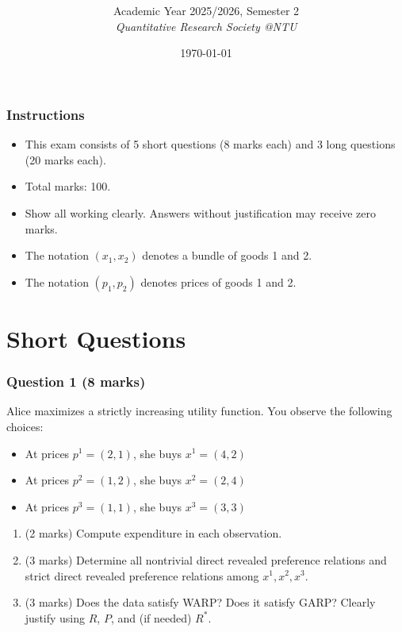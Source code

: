 \documentclass[12pt]{article}
\title{
\CourseCode \CourseName \\[0.3em]
\large \DocType
}
\author{
  Academic Year 2025/2026, Semester 2 \\[0.25em]
  \textit{Quantitative Research Society @NTU}
}
\date{\today}
\begin{document}
\maketitle
\thispagestyle{plainfirst}
\pagestyle{main}
\bigskip

\section*{Instructions}

\begin{itemize}
\item This exam consists of 5 short questions (8 marks each) and 3 long questions (20 marks each).
\item Total marks: 100.
\item Show all working clearly. Answers without justification may receive zero marks.
\item The notation $(x_1, x_2)$ denotes a bundle of goods 1 and 2.
\item The notation $(p_1, p_2)$ denotes prices of goods 1 and 2.
\end{itemize}

\bigskip

\newpage
\part{Short Questions}

\section*{Question 1 (8 marks)}

Alice maximizes a strictly increasing utility function. You observe the following choices:
\begin{itemize}
\item At prices $p^1=(2,1)$, she buys $x^1=(4,2)$
\item At prices $p^2=(1,2)$, she buys $x^2=(2,4)$
\item At prices $p^3=(1,1)$, she buys $x^3=(3,3)$
\end{itemize}

\begin{enumerate}[label=(\alph*)]
\item (2 marks) Compute expenditure in each observation.
\item (3 marks) Determine all nontrivial direct revealed preference relations and strict direct revealed preference relations among $x^1,x^2,x^3$.
\item (3 marks) Does the data satisfy WARP? Does it satisfy GARP? Clearly justify using $R$, $P$, and (if needed) $R^*$.
\end{enumerate}
\end{document}
